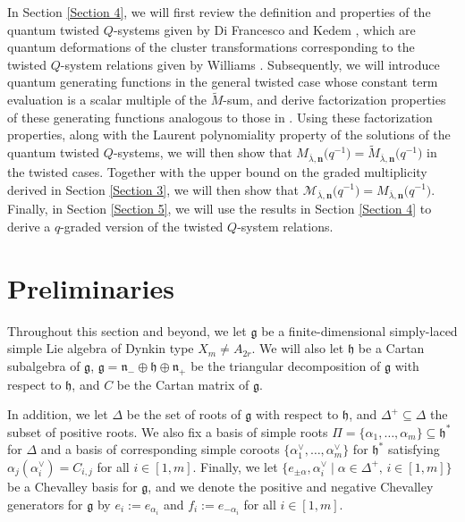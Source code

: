\documentclass[10pt,a4paper]{amsart}
\numberwithin{equation}{section}
\begin{document}
In Section \ref{Section 4}, we will first review the definition and properties of the quantum twisted $Q$-systems given by Di Francesco and Kedem \cite{DFK24}, which are quantum deformations of the cluster transformations corresponding to the twisted $Q$-system relations given by Williams \cite{Williams15}. Subsequently, we will introduce quantum generating functions in the general twisted case whose constant term evaluation is a scalar multiple of the $\tilde{M}$-sum, and derive factorization properties of these generating functions analogous to those in \cite{DFK08, DFK14, Lin21}. Using these factorization properties, along with the Laurent polynomiality property of the solutions of the quantum twisted $Q$-systems, we will then show that $M_{\overline{ \lambda},\mathbf{n}}\bigl(q^{-1}\bigr)=\tilde{M}_{\overline{\lambda},\mathbf{n}}\bigl(q^{-1}\bigr)$ in the twisted cases. Together with the upper bound on the graded multiplicity  derived in Section \ref{Section 3}, we will then show that $\mathcal{M}_{\overline{\lambda},\mathbf{n}}\bigl(q^{-1}\bigr)=M_{\overline{\lambda},\mathbf{n}}\bigl(q^{-1}\bigr)$. Finally, in Section \ref{Section 5}, we will use the results in Section \ref{Section 4} to derive a $q$-graded version of the twisted $Q$-system relations.

\section{Preliminaries}\label{Section 2}

Throughout this section and beyond, we let $\mathfrak{g}$ be a finite-dimensional simply-laced simple Lie algebra of Dynkin type $X_m\neq A_{2r}$. We will also let $\mathfrak{h}$ be a Cartan subalgebra of $\mathfrak{g}$, $\mathfrak{g}=\mathfrak{n}_-\oplus\mathfrak{h}\oplus\mathfrak{n}_+$ be the triangular decomposition of $\mathfrak{g}$ with respect to $\mathfrak{h}$, and $C$ be the Cartan matrix of $\mathfrak{g}$.

In addition, we let $\Delta$ be the set of roots of $\mathfrak{g}$ with respect to $\mathfrak{h}$, and $\Delta^+\subseteq\Delta$ the subset of positive roots. We also fix a basis of simple roots $\Pi=\{\alpha_1,\dots,\alpha_m\}\subseteq\mathfrak{h}^*$ for $\Delta$ and a basis of corresponding simple coroots $\{\alpha_1^{\vee},\dots,\alpha_m^{\vee}\}$ for $\mathfrak{h}^*$ satisfying $\alpha_j(\alpha_i^{\vee})=C_{i,j}$ for all $i\in[1,m]$.
Finally, we let $\{e_{\pm\alpha},\alpha_i^{\vee}\mid \alpha\in\Delta^+,\,i\in[1,m]\}$ be a Chevalley basis for $\mathfrak{g}$, and we denote the positive and negative Chevalley generators for $\mathfrak{g}$ by $e_i:=e_{\alpha_i}$ and $f_i:=e_{-\alpha_i}$ for all $i\in[1,m]$.
\end{document}
